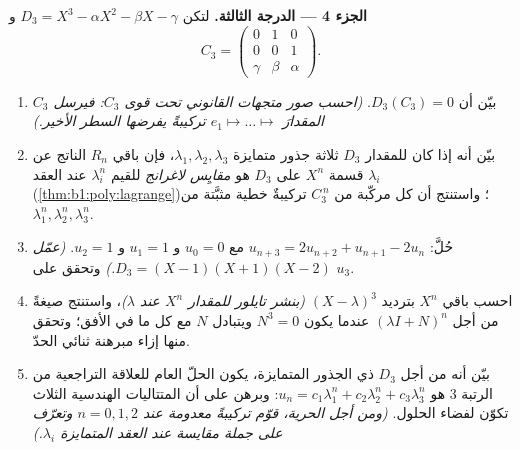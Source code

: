 \begin{problem}
\medskip
\noindent\textbf{الجزء 4 --- الدرجة الثالثة.} لتكن $D_3 = X^3 -
\alpha X^2 - \beta X - \gamma$ و
\[
C_3 = \begin{pmatrix} 0 & 1 & 0\\ 0 & 0 & 1\\ \gamma & \beta &
\alpha \end{pmatrix}.
\]
\begin{enumerate}[resume]
  \item بيّن أن $D_3(C_3) = 0$. \emph{(احسب صور
        متجهات  القانوني تحت قوى $C_3$: فيرسل
         $C_3$ المقدارَ $e_1 \mapsto \dots \mapsto$ تركيبةً
        يفرضها السطر الأخير.)}
  \item بيّن أنه إذا كان للمقدار $D_3$ ثلاثة جذور متمايزة $\lambda_1,
        \lambda_2, \lambda_3$، فإن باقي $R_n$ الناتج عن قسمة $X^n$
        على $D_3$ هو \emph{مقايِس لاغرانج}
        للقيم $\lambda_i^n$ عند العقد $\lambda_i$
        (\cref{thm:b1:poly:lagrange})؛ واستنتج أن كل مركّبة
        من $C_3^{\,n}$ تركيبةٌ خطية مثبَّتة من
        $\lambda_1^n, \lambda_2^n, \lambda_3^n$.
  \item حُلَّ: $u_{n+3} = 2u_{n+2} + u_{n+1} - 2u_n$ مع $u_0 =
        0$ و $u_1 = 1$ و $u_2 = 1$. \emph{(عمّل $D_3 = (X - 1)(X
        + 1)(X - 2)$.)} وتحقق على $u_3$.
  \item احسب باقي $X^n$ بترديد $(X -
        \lambda)^3$ \emph{(بنشر تايلور للمقدار $X^n$ عند
        $\lambda$)}، واستنتج صيغةً من أجل $(\lambda I +
        N)^n$ عندما يكون $N^3 = 0$ ويتبادل $N$ مع كل ما في
        الأفق؛ وتحقق منها إزاء مبرهنة ثنائي الحدّ.
  \item بيّن أنه من أجل $D_3$ ذي الجذور المتمايزة، يكون الحلّ
        العام للعلاقة التراجعية من الرتبة $3$ هو $u_n = c_1
        \lambda_1^n + c_2\lambda_2^n + c_3\lambda_3^n$: وبرهن
        على أن المتتاليات الهندسية الثلاث تكوّن  لفضاء
        الحلول. \emph{(ومن أجل الحرية، قوّم تركيبةً
        معدومة عند $n = 0, 1, 2$ وتعرّف على جملة
        مقايسة عند العقد المتمايزة
        $\lambda_i$.)}
\end{enumerate}


\end{problem}
